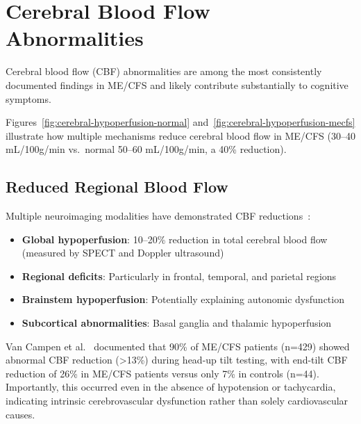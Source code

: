 \section{Cerebral Blood Flow Abnormalities}
\label{sec:cerebral-blood-flow}

Cerebral blood flow (CBF) abnormalities are among the most consistently documented findings in ME/CFS and likely contribute substantially to cognitive symptoms.





Figures~\ref{fig:cerebral-hypoperfusion-normal} and~\ref{fig:cerebral-hypoperfusion-mecfs} illustrate how multiple mechanisms reduce cerebral blood flow in ME/CFS (30--40 mL/100g/min vs.\ normal 50--60 mL/100g/min, a 40\% reduction).

\subsection{Reduced Regional Blood Flow}

Multiple neuroimaging modalities have demonstrated CBF reductions~\cite{vanCampen2020severity}:

\begin{itemize}
    \item \textbf{Global hypoperfusion}: 10--20\% reduction in total cerebral blood flow (measured by SPECT and Doppler ultrasound)
    \item \textbf{Regional deficits}: Particularly in frontal, temporal, and parietal regions
    \item \textbf{Brainstem hypoperfusion}: Potentially explaining autonomic dysfunction~\cite{Barnden2011brainstem}
    \item \textbf{Subcortical abnormalities}: Basal ganglia and thalamic hypoperfusion
\end{itemize}

Van Campen et al.~\cite{vanCampen2020severity} documented that 90\% of ME/CFS patients (n=429) showed abnormal CBF reduction (>13\%) during head-up tilt testing, with end-tilt CBF reduction of 26\% in ME/CFS patients versus only 7\% in controls (n=44). Importantly, this occurred even in the absence of hypotension or tachycardia, indicating intrinsic cerebrovascular dysfunction rather than solely cardiovascular causes.

